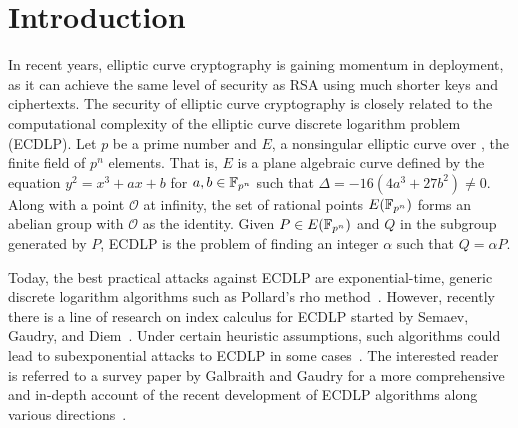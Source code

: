 %
%

\section{Introduction}
%
In recent years, elliptic curve cryptography is gaining momentum in
deployment, as it can achieve the same level of security as RSA using
much shorter keys and ciphertexts.
%
The security of elliptic curve cryptography is closely related to the
computational complexity of the elliptic curve discrete logarithm
problem (ECDLP).
%
Let $p$ be a prime number and $E$, a nonsingular elliptic curve over
, the finite field of $p^n$ elements.
%
That is, $E$ is a plane algebraic curve defined by the equation
$y^2=x^3+ax+b$ for $a,b\in\mathbb F_{p^n}$ such that
$\Delta=-16(4a^3+27b^2)\neq 0$.
%
Along with a point $\mathcal O$ at infinity, the set of rational
points $E(\mathbb F_{p^n})$ forms an abelian group with $\mathcal O$ as the
identity.
%
Given $P\in E(\mathbb F_{p^n})$ and $Q$ in the subgroup generated by $P$,
ECDLP is the problem of finding an integer $\alpha$ such that
$Q=\alpha P$.

Today, the best practical attacks against ECDLP are exponential-time,
generic discrete logarithm algorithms such as Pollard's rho
method~\cite{1978-pollard-kangaroo}.
%
However, recently there is a line of research on index calculus for
ECDLP started by Semaev, Gaudry, and
Diem~\cite{DBLP:journals/iacr/Semaev04,DBLP:journals/jsc/Gaudry09,DBLP:journals/moc/Diem11}.
%
Under certain heuristic assumptions, such algorithms could lead to
subexponential attacks to ECDLP in some
cases~\cite{DBLP:conf/eurocrypt/FaugerePPR12,DBLP:journals/iacr/PetitQ12,DBLP:conf/iwsec/HuangPST13}.
%
The interested reader is referred to a survey paper by Galbraith and
Gaudry for a more comprehensive and in-depth account of the recent
development of ECDLP algorithms along various
directions~\cite{DBLP:journals/dcc/GalbraithG16}.

